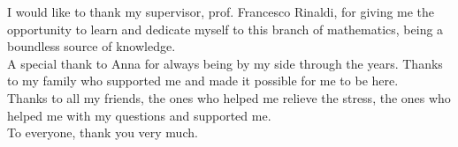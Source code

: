 I would like to thank my supervisor, prof. Francesco Rinaldi, for giving me the opportunity to learn and dedicate myself to this branch of mathematics, being a boundless source of knowledge.\\
A special thank to Anna for always being by my side through the years. Thanks to my family who supported me and made it possible for me to be here.\\
Thanks to all my friends, the ones who helped me relieve the stress, the ones who helped me with my questions and supported me.\\
To everyone, thank you very much.\\


